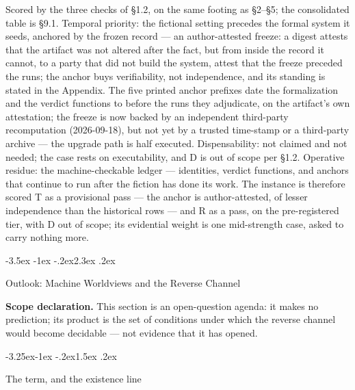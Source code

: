 \documentclass[11pt,a4paper]{article}
\makeatletter
\renewcommand\section{\@startsection{section}{1}{\z@}%
  {-3.5ex \@plus -1ex \@minus -.2ex}{2.3ex \@plus .2ex}%
  {\normalfont\Large\bfseries\raggedright}}
\renewcommand\subsection{\@startsection{subsection}{2}{\z@}%
  {-3.25ex\@plus -1ex \@minus -.2ex}{1.5ex \@plus .2ex}%
  {\normalfont\large\bfseries\raggedright}}
\makeatother
\begin{document}
Scored by the three checks of §1.2, on the same footing as §2–§5; the consolidated table is §9.1. Temporal priority: the fictional setting precedes the formal system it seeds, anchored by the frozen record — an author-attested freeze: a digest attests that the artifact was not altered after the fact, but from inside the record it cannot, to a party that did not build the system, attest that the freeze preceded the runs; the anchor buys verifiability, not independence, and its standing is stated in the Appendix. The five printed anchor prefixes date the formalization and the verdict functions to before the runs they adjudicate, on the artifact's own attestation; the freeze is now backed by an independent third-party recomputation (2026-09-18), but not yet by a trusted time-stamp or a third-party archive — the upgrade path is half executed. Dispensability: not claimed and not needed; the case rests on executability, and D is out of scope per §1.2. Operative residue: the machine-checkable ledger — identities, verdict functions, and anchors that continue to run after the fiction has done its work. The instance is therefore scored T as a provisional pass — the anchor is author-attested, of lesser independence than the historical rows — and R as a pass, on the pre-registered tier, with D out of scope; its evidential weight is one mid-strength case, asked to carry nothing more.

\section{Outlook: Machine Worldviews and the Reverse Channel}

\textbf{Scope declaration.} This section is an open-question agenda: it makes no prediction; its product is the set of conditions under which the reverse channel would become decidable — not evidence that it has opened.

\subsection{The term, and the existence line}
\end{document}
